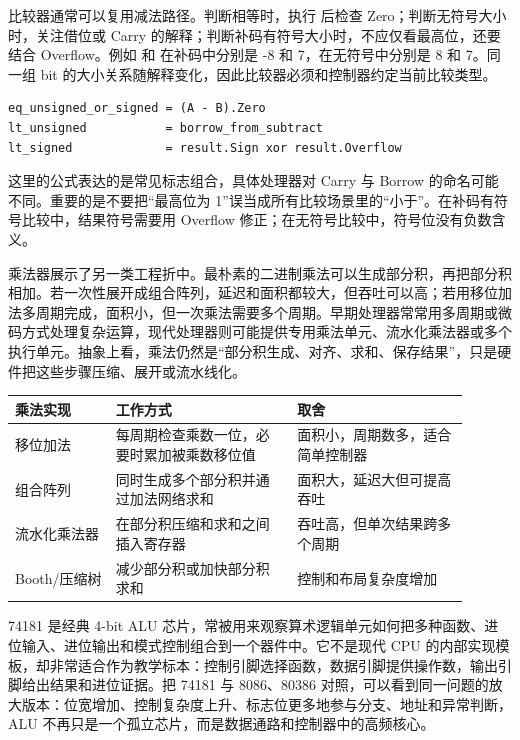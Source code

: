 比较器通常可以复用减法路径。判断相等时，执行  后检查 Zero；判断无符号大小时，关注借位或 Carry 的解释；判断补码有符号大小时，不应仅看最高位，还要结合 Overflow。例如  和  在补码中分别是 -8 和 7，在无符号中分别是 8 和 7。同一组 bit 的大小关系随解释变化，因此比较器必须和控制器约定当前比较类型。

\begin{lstlisting}
eq_unsigned_or_signed = (A - B).Zero
lt_unsigned           = borrow_from_subtract
lt_signed             = result.Sign xor result.Overflow
\end{lstlisting}

这里的公式表达的是常见标志组合，具体处理器对 Carry 与 Borrow 的命名可能不同。重要的是不要把“最高位为 1”误当成所有比较场景里的“小于”。在补码有符号比较中，结果符号需要用 Overflow 修正；在无符号比较中，符号位没有负数含义。

乘法器展示了另一类工程折中。最朴素的二进制乘法可以生成部分积，再把部分积相加。若一次性展开成组合阵列，延迟和面积都较大，但吞吐可以高；若用移位加法多周期完成，面积小，但一次乘法需要多个周期。早期处理器常常用多周期或微码方式处理复杂运算，现代处理器则可能提供专用乘法单元、流水化乘法器或多个执行单元。抽象上看，乘法仍然是“部分积生成、对齐、求和、保存结果”，只是硬件把这些步骤压缩、展开或流水线化。

\begin{longtable}{L{0.2\linewidth}L{0.36\linewidth}L{0.34\linewidth}}
\toprule
乘法实现 & 工作方式 & 取舍 \\
\midrule
移位加法 & 每周期检查乘数一位，必要时累加被乘数移位值 & 面积小，周期数多，适合简单控制器 \\
组合阵列 & 同时生成多个部分积并通过加法网络求和 & 面积大，延迟大但可提高吞吐 \\
流水化乘法器 & 在部分积压缩和求和之间插入寄存器 & 吞吐高，但单次结果跨多个周期 \\
Booth/压缩树 & 减少部分积或加快部分积求和 & 控制和布局复杂度增加 \\
\bottomrule
\end{longtable}

\begin{chipcase}
74181 是经典 4-bit ALU 芯片，常被用来观察算术逻辑单元如何把多种函数、进位输入、进位输出和模式控制组合到一个器件中。它不是现代 CPU 的内部实现模板，却非常适合作为教学标本：控制引脚选择函数，数据引脚提供操作数，输出引脚给出结果和进位证据。把 74181 与 8086、80386 对照，可以看到同一问题的放大版本：位宽增加、控制复杂度上升、标志位更多地参与分支、地址和异常判断，ALU 不再只是一个孤立芯片，而是数据通路和控制器中的高频核心。
\end{chipcase}


